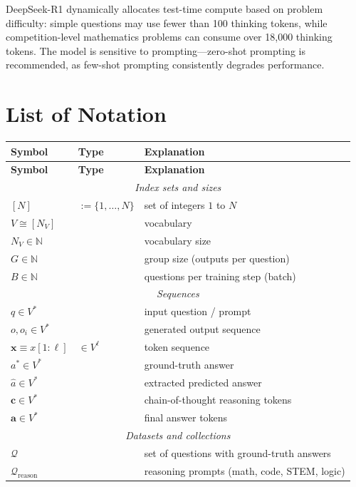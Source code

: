 \documentclass[11pt,a4paper]{article}
\newcommand{\vect}[1]{\bm{#1}}
\newcommand{\N}{\mathbb{N}}
\newcommand{\intset}[1]{[#1]}
\begin{document}
DeepSeek-R1 dynamically allocates test-time compute based on problem difficulty: simple questions may use fewer than 100 thinking tokens, while competition-level mathematics problems can consume over 18,000 thinking tokens. The model is sensitive to prompting---zero-shot prompting is recommended, as few-shot prompting consistently degrades performance.

\appendix
\section{List of Notation}

\begin{longtable}{lll}
\toprule
\textbf{Symbol} & \textbf{Type} & \textbf{Explanation} \\
\midrule
\endfirsthead
\toprule
\textbf{Symbol} & \textbf{Type} & \textbf{Explanation} \\
\midrule
\endhead
\multicolumn{3}{c}{\textit{Index sets and sizes}} \\
\midrule
$\intset{N}$ & $:= \{1,\ldots,N\}$ & set of integers $1$ to $N$ \\
$V \cong \intset{N_V}$ & & vocabulary \\
$N_V \in \N$ & & vocabulary size \\
$G \in \N$ & & group size (outputs per question) \\
$B \in \N$ & & questions per training step (batch) \\
\midrule
\multicolumn{3}{c}{\textit{Sequences}} \\
\midrule
$q \in V^*$ & & input question / prompt \\
$o, o_i \in V^*$ & & generated output sequence \\
$\vect{x} \equiv x[1:\ell]$ & $\in V^\ell$ & token sequence \\
$a^* \in V^*$ & & ground-truth answer \\
$\hat{a} \in V^*$ & & extracted predicted answer \\
$\vect{c} \in V^*$ & & chain-of-thought reasoning tokens \\
$\vect{a} \in V^*$ & & final answer tokens \\
\midrule
\multicolumn{3}{c}{\textit{Datasets and collections}} \\
\midrule
$\mathcal{Q}$ & & set of questions with ground-truth answers \\
$\mathcal{Q}_{\mathrm{reason}}$ & & reasoning prompts (math, code, STEM, logic) \\

\end{longtable}
\end{document}
